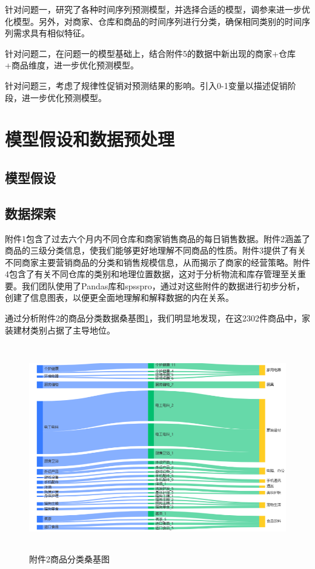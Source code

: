 \documentclass[withoutpreface,bwprint]{cumcmthesis}
\begin{document}
     针对问题一，研究了各种时间序列预测模型，并选择合适的模型，调参来进一步优化模型。另外，对商家、仓库和商品的时间序列进行分类，确保相同类别的时间序列需求具有相似特征。

     针对问题二，在问题一的模型基础上，结合附件5的数据中新出现的商家+仓库+商品维度，进一步优化预测模型。

     针对问题三，考虑了规律性促销对预测结果的影响。引入0-1变量以描述促销阶段，进一步优化预测模型。
     
    \section{模型假设和数据预处理}
    \subsection{模型假设}

    \subsection{数据探索}
    附件1包含了过去六个月内不同仓库和商家销售商品的每日销售数据。附件2涵盖了商品的三级分类信息，使我们能够更好地理解不同商品的性质。附件3提供了有关不同商家主要营销商品的分类和销售规模信息，从而揭示了商家的经营策略。附件4包含了有关不同仓库的类别和地理位置数据，这对于分析物流和库存管理至关重要。我们团队使用了Pandas库和spsspro，通过对这些附件的数据进行初步分析，创建了信息图表，以便更全面地理解和解释数据的内在关系。

    通过分析附件2的商品分类数据桑基图\ref{附件2商品分类桑基图}，我们明显地发现，在这2302件商品中，家装建材类别占据了主导地位。
    \begin{figure}[htbp]
     \centering
     \includegraphics[width=15cm,height=9cm]{figure/附件2数据分析2.png}%
     \caption{附件2商品分类桑基图}
     \label{附件2商品分类桑基图}
    \end{figure}
\end{document}
